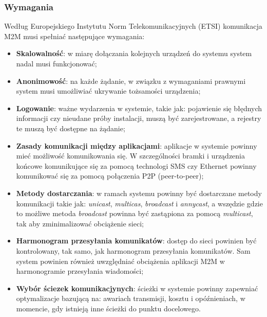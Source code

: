\subsubsection{Wymagania}
\hspace{1cm}Według Europejskiego Instytutu Norm Telekomunikacyjnych (ETSI) komunikacja M2M musi spełniać następujące wymagania:
\begin{itemize}
  \item \textbf{Skalowalność}: w miarę dołączania kolejnych urządzeń do systemu system nadal musi funkcjonować;
  \item \textbf{Anonimowość}: na każde żądanie, w związku z wymaganiami prawnymi system musi umożliwiać ukrywanie tożsamości urządzenia;
  \item \textbf{Logowanie}: ważne wydarzenia w systemie, takie jak: pojawienie się błędnych informacji czy nieudane próby instalacji, muszą być zarejestrowane, a rejestry te muszą być dostępne na żądanie;
  \item \textbf{Zasady komunikacji między aplikacjami}: aplikacje w systemie powinny mieć możliwość komunikowania się. W szczególności bramki i urządzenia końcowe komunikujące się za pomocą technologi SMS czy Ethernet powinny komunikować
  się za pomocą połączenia P2P (peer-to-peer);
  \item  \textbf{Metody dostarczania}: w ramach systemu powinny być dostarczane metody komunikacji takie jak: \emph{unicast}, \emph{multicas}, \emph{broadcast} i \emph{annycast}, a wszędzie gdzie to możliwe metoda \emph{broadcast} powinna być zastąpiona za pomocą \emph{multicast}, tak aby zminimalizować obciążenie sieci;
  \item \textbf{Harmonogram przesyłania komunikatów}:  dostęp do sieci powinien być kontrolowany, tak samo, jak harmonogram przesyłania komunikatów. Sam system powinien również uwzględniać obciążenia aplikacji M2M w harmonogramie przesyłania wiadomości;
  \item \textbf{Wybór ściezek komunikacjynych}: ścieżki w systemie powinny zapewniać optymalizacje bazującą na: awariach transmisji, kosztu i opóźnieniach, w momencie, gdy istnieją inne ścieżki do punktu docelowego. \cite{m2m-web}
\end{itemize}

